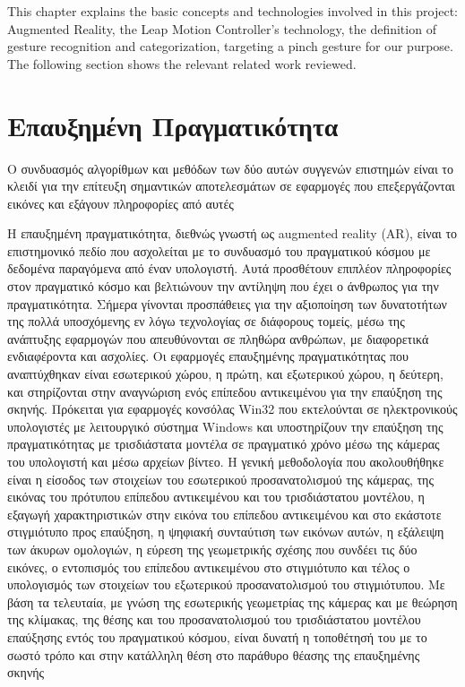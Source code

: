 

 \label{c:complex}

This chapter explains the basic concepts and technologies involved in this project: Augmented Reality, the Leap Motion Controller’s technology, the definition of gesture recognition and categorization, targeting a pinch gesture for our purpose. The following section shows the relevant related work reviewed.



\section{Επαυξημένη Πραγματικότητα}

Ο συνδυασμός αλγορίθμων και μεθόδων των δύο
αυτών συγγενών επιστημών είναι το κλειδί για την επίτευξη σημαντικών αποτελεσμάτων σε
εφαρμογές που επεξεργάζονται εικόνες και εξάγουν πληροφορίες από αυτές


Η επαυξημένη πραγματικότητα, διεθνώς γνωστή ως augmented reality (AR), είναι το επιστημονικό πεδίο που ασχολείται με το συνδυασμό του πραγματικού κόσμου με δεδομένα παραγόμενα από έναν υπολογιστή. Αυτά προσθέτουν επιπλέον πληροφορίες στον πραγματικό κόσμο και βελτιώνουν την αντίληψη που έχει ο άνθρωπος για την πραγματικότητα. Σήμερα γίνονται προσπάθειες για την αξιοποίηση των δυνατοτήτων της πολλά υποσχόμενης εν λόγω τεχνολογίας σε διάφορους τομείς, μέσω της ανάπτυξης εφαρμογών που απευθύνονται σε πληθώρα ανθρώπων, με διαφορετικά ενδιαφέροντα και ασχολίες. Οι εφαρμογές επαυξημένης πραγματικότητας που αναπτύχθηκαν είναι εσωτερικού χώρου, η πρώτη, και εξωτερικού χώρου, η δεύτερη, και στηρίζονται στην αναγνώριση ενός επίπεδου αντικειμένου για την επαύξηση της σκηνής. Πρόκειται για εφαρμογές κονσόλας Win32 που εκτελούνται σε ηλεκτρονικούς υπολογιστές με λειτουργικό σύστημα Windows και υποστηρίζουν την επαύξηση της πραγματικότητας με τρισδιάστατα μοντέλα σε πραγματικό χρόνο μέσω της κάμερας του υπολογιστή και μέσω αρχείων βίντεο. Η γενική μεθοδολογία που ακολουθήθηκε είναι η είσοδος των στοιχείων του εσωτερικού προσανατολισμού της κάμερας, της εικόνας του πρότυπου επίπεδου αντικειμένου και του τρισδιάστατου μοντέλου, η εξαγωγή χαρακτηριστικών στην εικόνα του επίπεδου αντικειμένου και στο εκάστοτε στιγμιότυπο προς επαύξηση, η ψηφιακή συνταύτιση των εικόνων αυτών, η εξάλειψη των άκυρων ομολογιών, η εύρεση της γεωμετρικής σχέσης που συνδέει τις δύο εικόνες, ο εντοπισμός του επίπεδου αντικειμένου στο στιγμιότυπο και τέλος ο υπολογισμός των στοιχείων του εξωτερικού προσανατολισμού του στιγμιότυπου. Με βάση τα τελευταία, με γνώση της εσωτερικής γεωμετρίας της κάμερας και με θεώρηση της κλίμακας, της θέσης και του προσανατολισμού του τρισδιάστατου μοντέλου επαύξησης εντός του πραγματικού κόσμου, είναι δυνατή η τοποθέτησή του με το σωστό τρόπο και στην κατάλληλη θέση στο παράθυρο θέασης της επαυξημένης σκηνής
%

